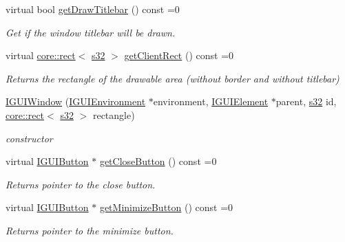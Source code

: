 \begin{DoxyCompactItemize}
\mbox{\label{classirr_1_1gui_1_1IGUIWindow_a634a224a31577fb7eeef578c9a351b69}} 
virtual bool \hyperlink{classirr_1_1gui_1_1IGUIWindow_a634a224a31577fb7eeef578c9a351b69}{get\+Draw\+Titlebar} () const =0
\begin{DoxyCompactList}\small\item\em Get if the window titlebar will be drawn. \end{DoxyCompactList}\item 
virtual \hyperlink{classirr_1_1core_1_1rect}{core\+::rect}$<$ \hyperlink{namespaceirr_ac66849b7a6ed16e30ebede579f9b47c6}{s32} $>$ \hyperlink{classirr_1_1gui_1_1IGUIWindow_aa6d240eb9d5b9b44c0e45fcef47e6216}{get\+Client\+Rect} () const =0
\begin{DoxyCompactList}\small\item\em Returns the rectangle of the drawable area (without border and without titlebar) \end{DoxyCompactList}\item 
\mbox{\label{classirr_1_1gui_1_1IGUIWindow_a964282be17981b8287b0a85d65a4008d}} 
\hyperlink{classirr_1_1gui_1_1IGUIWindow_a964282be17981b8287b0a85d65a4008d}{I\+G\+U\+I\+Window} (\hyperlink{classirr_1_1gui_1_1IGUIEnvironment}{I\+G\+U\+I\+Environment} $\ast$environment, \hyperlink{classirr_1_1gui_1_1IGUIElement}{I\+G\+U\+I\+Element} $\ast$parent, \hyperlink{namespaceirr_ac66849b7a6ed16e30ebede579f9b47c6}{s32} id, \hyperlink{classirr_1_1core_1_1rect}{core\+::rect}$<$ \hyperlink{namespaceirr_ac66849b7a6ed16e30ebede579f9b47c6}{s32} $>$ rectangle)
\begin{DoxyCompactList}\small\item\em constructor \end{DoxyCompactList}\item 
virtual \hyperlink{classirr_1_1gui_1_1IGUIButton}{I\+G\+U\+I\+Button} $\ast$ \hyperlink{classirr_1_1gui_1_1IGUIWindow_ae5b6abf3c9d8d0af5539adf3fea8db70}{get\+Close\+Button} () const =0
\begin{DoxyCompactList}\small\item\em Returns pointer to the close button. \end{DoxyCompactList}\item 
virtual \hyperlink{classirr_1_1gui_1_1IGUIButton}{I\+G\+U\+I\+Button} $\ast$ \hyperlink{classirr_1_1gui_1_1IGUIWindow_a9c9b5060ca57c46bfece1339ef30facb}{get\+Minimize\+Button} () const =0
\begin{DoxyCompactList}\small\item\em Returns pointer to the minimize button. \end{DoxyCompactList}\item 

\end{DoxyCompactItemize}
